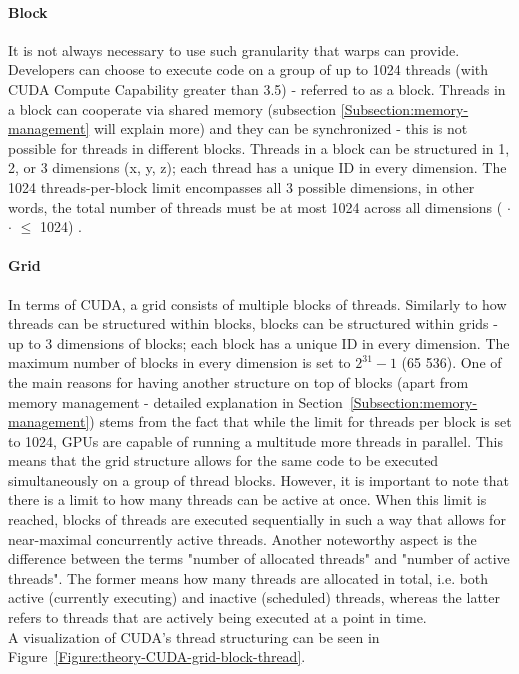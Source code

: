 \paragraph{Block}\label{Paragraph:theory-CUDA-thread-management-block}
It is not always necessary to use such granularity that warps can provide. Developers can choose to execute code on a group of up to 1024 threads (with CUDA Compute Capability greater than 3.5) - referred to as a block. Threads in a block can cooperate via shared memory (subsection \ref{Subsection:memory-management} will explain more) and they can be synchronized - this is not possible for threads in different blocks. Threads in a block can be structured in 1, 2, or 3 dimensions (x, y, z); each thread has a unique ID in every dimension. The 1024 threads-per-block limit encompasses all 3 possible dimensions, in other words, the total number of threads must be at most 1024 across all dimensions ( $ \cdot $  $ \cdot $  $ \leq$ 1024) \cite{AbiChahla18June2008, NVIDIAMay2022}.

\paragraph{Grid}\label{Paragraph:theory-CUDA-thread-management-grid}
In terms of CUDA, a grid consists of multiple blocks of threads. Similarly to how threads can be structured within blocks, blocks can be structured within grids - up to 3 dimensions of blocks; each block has a unique ID in every dimension. The maximum number of blocks in every dimension is set to $ 2^{31} - 1 $ (65 536). One of the main reasons for having another structure on top of blocks (apart from memory management - detailed explanation in Section~\ref{Subsection:memory-management}) stems from the fact that while the limit for threads per block is set to 1024, GPUs are capable of running a multitude more threads in parallel. This means that the grid structure allows for the same code to be executed simultaneously on a group of thread blocks. However, it is important to note that there is a limit to how many threads can be active at once. When this limit is reached, blocks of threads are executed sequentially in such a way that allows for near-maximal concurrently active threads. Another noteworthy aspect is the difference between the terms "number of allocated threads" and "number of active threads". The former means how many threads are allocated in total, i.e. both active (currently executing) and inactive (scheduled) threads, whereas the latter refers to threads that are actively being executed at a point in time. \\
A visualization of CUDA's thread structuring can be seen in Figure~\ref{Figure:theory-CUDA-grid-block-thread}.

